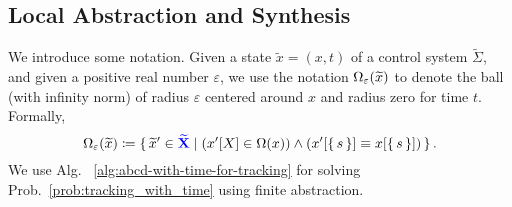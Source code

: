 \subsection{Local Abstraction and Synthesis}

We introduce some notation.
Given a state $\widetilde x=(x,t)$ of a control system $\widetilde \Sigma$, and given a positive real number $\varepsilon$, we use the notation $\Omega_\varepsilon(\widetilde x)$ to denote the ball (with infinity norm) of radius $\varepsilon$ centered around $x$ and radius zero for time $t$.
Formally, \[\Omega_\varepsilon(\widetilde{x})\coloneqq \set{\widetilde{x}'
	\in {\color{blue} \mathbf{\widetilde{X}}} \mid  (x'[X] \in \Omega(x)) \land (x'[\set{s}]\equiv x[\set{s}])}.\] 
We use Alg.~ \ref{alg:abcd-with-time-for-tracking} for solving Prob.~\ref{prob:tracking_with_time} using finite abstraction.



